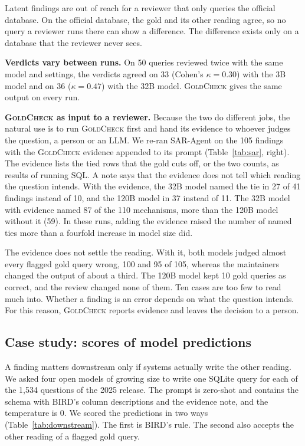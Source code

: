 \documentclass[conference]{IEEEtran}
\newcommand{\sys}{\textsc{GoldCheck}}
\begin{document}
Latent findings are out of reach for a reviewer that only queries the official database. On the official
database, the gold and its other reading agree, so no query a reviewer runs there
can show a difference. The difference exists only on a database that the
reviewer never sees.

\textbf{Verdicts vary between runs.} On 50 queries reviewed twice with the same
model and settings, the verdicts agreed on 33 (Cohen's $\kappa=0.30$) with the 3B
model and on 36 ($\kappa=0.47$) with the 32B model. \sys{} gives the same output
on every run.

\textbf{\sys{} as input to a reviewer.} Because the two do different jobs, the
natural use is to run \sys{} first and hand its evidence to whoever judges the
question, a person or an LLM. We re-ran SAR-Agent on the 105 findings with the
\sys{} evidence appended to its prompt (Table~\ref{tab:sar}, right). The
evidence lists the tied rows that the gold cuts off, or the two counts, as
results of running SQL. A note says that the evidence does not tell which
reading the question intends. With the
evidence, the 32B model named the tie in 27 of 41 findings instead of 10, and
the 120B model in 37 instead of 11. The 32B model with evidence named 87 of the
110 mechanisms, more than the 120B model without it (59). In these runs, adding the evidence raised the number of named ties more than a fourfold increase in model size did.

The evidence does not settle the reading. With it, both models judged almost
every flagged gold query wrong, 100 and 95 of 105, whereas the maintainers
changed the output of about a third. The 120B model kept 10 gold queries as
correct, and the review changed none of them. Ten cases are too few to read much
into. Whether a finding is an error depends on what the question intends. For
this reason, \sys{} reports evidence and leaves the decision to a person.

\subsection{Case study: scores of model predictions}
\label{sec:downstream}
A finding matters downstream only if systems actually write the other reading.
We asked four open models of growing size to write one SQLite query for each of
the 1,534 questions of the 2025 release. The prompt is zero-shot and contains the
schema with BIRD's column descriptions and the evidence note, and the
temperature is 0. We scored the predictions in two ways
(Table~\ref{tab:downstream}). The first is BIRD's rule. The second also accepts
the other reading of a flagged gold query.
\end{document}
